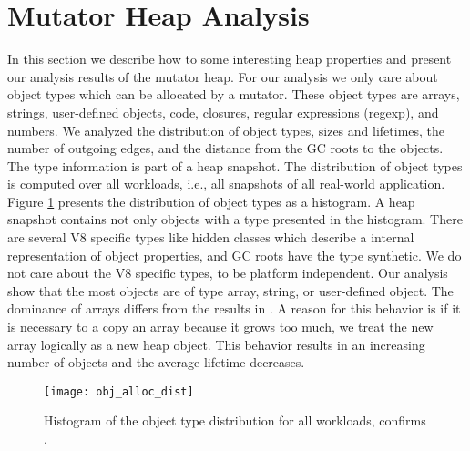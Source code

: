 
\section{Mutator Heap Analysis} \label{sec:analysis_mutator}

In this section we describe how to some interesting heap properties and present our analysis results of the mutator heap. For our analysis we only care about object types which can be allocated by a mutator. These object types are arrays, strings, user-defined objects, code, closures, regular expressions (regexp), and numbers. We analyzed the distribution of object types, sizes and lifetimes, the number of outgoing edges, and the distance from the GC roots to the objects. 
The type information is part of a heap snapshot. The distribution of object types is computed over all workloads, i.e., all snapshots of all real-world application. Figure \ref{fig:obj_alloc_dist} presents the distribution of object types as a histogram. A heap snapshot contains not only objects with a type presented in the histogram. There are several V8 specific types like hidden classes which describe a internal representation of object properties, and GC roots have the type synthetic. We do not care about the V8 specific types, to be platform independent. Our analysis show that the most objects are of type array, string, or user-defined object. The dominance of arrays differs from the results in \cite{JSMeter2009}. A reason for this behavior is if it is necessary to a copy an array because it grows too much, we treat the new array logically as a new heap object. This behavior results in an increasing number of objects and the average lifetime decreases. 
\begin{figure}
	\centering
	\texttt{[image: obj\_alloc\_dist]}
	\caption{Histogram of the object type distribution for all workloads, confirms \cite{JSMeter2009}.}
	\label{fig:obj_alloc_dist}
\end{figure}


